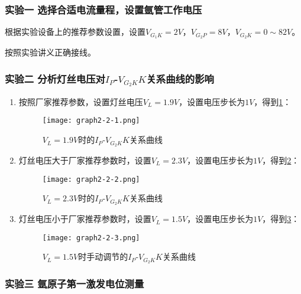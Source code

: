 \documentclass[dvipsnames, svgnames,a4paper,11pt]{article}
\begin{document}
	\subsubsection{实验一 \quad 选择合适电流量程，设置氩管工作电压}
	
		根据实验设备上的推荐参数设置，设置$V_{G_1K}=2V$，$V_{G_2P}=8V$，$V_{G_2K}=0\sim82V$。

		按照实验讲义正确接线。



	\subsubsection{实验二 \quad 分析灯丝电压对$I_P$-$V_{G_2K}K$关系曲线的影响}

		\begin{enumerate}
			\item 按照厂家推荐参数，设置灯丝电压$V_L=1.9V$，设置电压步长为$1V$，得到\cref{fig:graph2-2-1}：
			
				\begin{figure}[htbp]
					\centering
					\texttt{[image: graph2-2-1.png]}
					\caption{$V_L=1.9V$时的$I_P$-$V_{G_2K}K$关系曲线}
					\label{fig:graph2-2-1}
				\end{figure}

			\item 灯丝电压大于厂家推荐参数时，设置$V_L=2.3V$，设置电压步长为$1V$，得到\cref{fig:graph2-2-2}：
			
				\begin{figure}[htbp]
					\centering
					\texttt{[image: graph2-2-2.png]}
					\caption{$V_L=2.3V$时的$I_P$-$V_{G_2K}K$关系曲线}
					\label{fig:graph2-2-2}
				\end{figure}

			\item 灯丝电压小于厂家推荐参数时，设置$V_L=1.5V$，设置电压步长为$1V$，得到\cref{fig:graph2-2-3}：
			
			\begin{figure}[htbp]
				\centering
				\texttt{[image: graph2-2-3.png]}
				\caption{$V_L=1.5V$时手动调节的$I_P$-$V_{G_2K}K$关系曲线}
				\label{fig:graph2-2-3}
			\end{figure}
				


		\end{enumerate}



	\subsubsection{实验三 \quad 氩原子第一激发电位测量}
\end{document}
